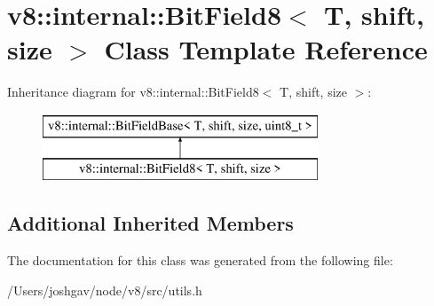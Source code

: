\hypertarget{classv8_1_1internal_1_1_bit_field8}{}\section{v8\+:\+:internal\+:\+:Bit\+Field8$<$ T, shift, size $>$ Class Template Reference}
\label{classv8_1_1internal_1_1_bit_field8}
Inheritance diagram for v8\+:\+:internal\+:\+:Bit\+Field8$<$ T, shift, size $>$\+:\begin{figure}[H]
\begin{center}
\leavevmode
\includegraphics[height=2.000000cm]{classv8_1_1internal_1_1_bit_field8}
\end{center}
\end{figure}
\subsection*{Additional Inherited Members}


The documentation for this class was generated from the following file\+:\begin{DoxyCompactItemize}
\item 
/\+Users/joshgav/node/v8/src/utils.\+h\end{DoxyCompactItemize}

